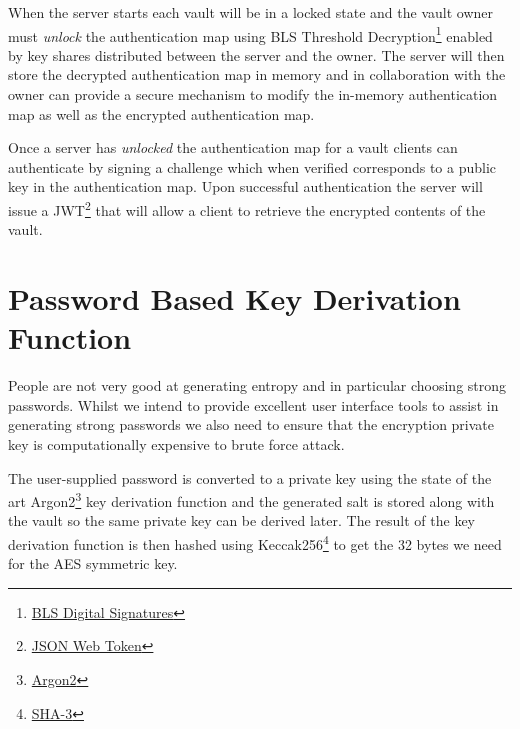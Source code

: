 \documentclass[a4paper,titlepage,oneside]{article}
\renewcommand{\paragraph}{\small}
\begin{document}
\paragraph{When the server starts each vault will be in a locked state and the vault owner must \emph{unlock} the authentication map using BLS Threshold Decryption\footnote{\href{https://en.wikipedia.org/wiki/BLS_digital_signature}{BLS Digital Signatures}} enabled by key shares distributed between the server and the owner. The server will then store the decrypted authentication map in memory and in collaboration with the owner can provide a secure mechanism to modify the in-memory authentication map as well as the encrypted authentication map.}

\paragraph{Once a server has \emph{unlocked} the authentication map for a vault clients can authenticate by signing a challenge which when verified corresponds to a public key in the authentication map. Upon successful authentication the server will issue a JWT\footnote{\href{https://en.wikipedia.org/wiki/JSON_Web_Token}{JSON Web Token}} that will allow a client to retrieve the encrypted contents of the vault.}

\section{Password Based Key Derivation Function}

\paragraph{People are not very good at generating entropy and in particular choosing strong passwords. Whilst we intend to provide excellent user interface tools to assist in generating strong passwords we also need to ensure that the encryption private key is computationally expensive to brute force attack.}

\paragraph{The user-supplied password is converted to a private key using the state of the art Argon2\footnote{\href{https://en.wikipedia.org/wiki/Argon2}{Argon2}} key derivation function and the generated salt is stored along with the vault so the same private key can be derived later. The result of the key derivation function is then hashed using Keccak256\footnote{\href{https://en.wikipedia.org/wiki/SHA-3}{SHA-3}} to get the 32 bytes we need for the AES symmetric key.}
\end{document}
